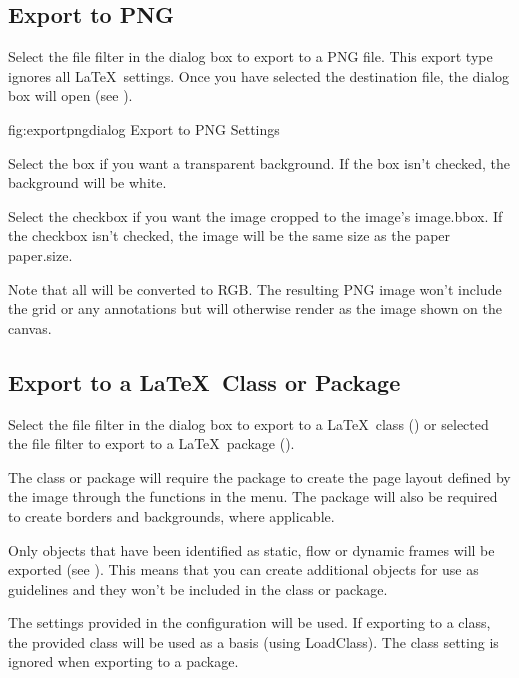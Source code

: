 \subsection{Export to PNG}\label{sec:exportpng}

Select the  file filter in the
 dialog box to export to a PNG file. This export type
ignores all \LaTeX\ settings. Once you have selected the destination
 file, the 
dialog box will open (see ).

\FloatFig
  {fig:exportpngdialog}
  {}
  {Export to PNG Settings}

Select the  box if you want a \gls{transparent}
background. If the box isn't checked, the background will be white.

Select the  checkbox if you want the image cropped
to the image's \gls{image.bbox}. If the checkbox isn't checked, the image
will be the same size as the paper \gls{paper.size}. 

Note that all  will be converted to RGB.
The resulting PNG image won't include the grid or any annotations
but will otherwise render as the image shown on the \gls{canvas}.

\subsection{Export to a \LaTeX\ Class or Package}\label{sec:exportsty}

Select the  file filter in the
 dialog box to export to a \LaTeX\ class
() or selected the 
file filter to export to a \LaTeX\ package ().

The class or package will require the  package to
create the page layout defined by the image through the functions in
the  menu.  The  package will also be
required to create borders and backgrounds, where applicable.

Only \glspl{object} that have been identified as static, flow or
dynamic frames will be exported (see ).
This means that you can create additional \glspl{object} for use as
guidelines and they won't be included in the class or package.

The settings provided in the  configuration
will be used. If exporting to a class, the provided class will be
used as a basis (using \gls{LoadClass}). The class setting is
ignored when exporting to a package.

